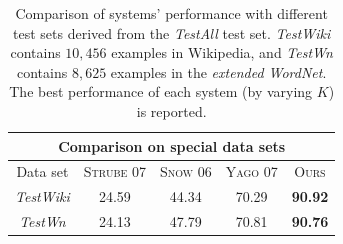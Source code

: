 \begin{table}[!t]
  \begin{center}
    \begin{tabular}{|c||c|c|c|c|}
      \hline
      \multicolumn{5}{|c|}{Comparison on special data sets} \\
      \hline
      Data set &  \textsc{Strube 07}  &  \textsc{Snow 06}  &  \textsc{Yago 07}  &  \textsc{Ours}   \\
      \hline
      {\em TestWiki}  &               24.59  &             44.34  &             70.29  &  \textbf{90.92}  \\
      {\em TestWn}    &               24.13  &             47.79  &             70.81  &  \textbf{90.76}  \\
      \hline
    \end{tabular}
    \caption{Comparison of systems' performance with different test
      sets derived from the {\em TestAll} test set. {\em TestWiki}
      contains $10,456$ examples in Wikipedia, and {\em TestWn}
      contains $8,625$ examples in the {\em extended WordNet}. The
      best performance of each system (by varying $K$) is reported.}
    \label{table:exp-diff-test}
  \end{center}
\end{table}

